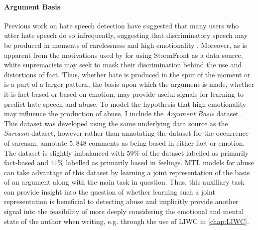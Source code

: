 \paragraph{Argument Basis}
Previous work on hate speech detection have suggested that many users who utter hate speech do so infrequently, suggesting that discriminatory speech may be produced in moments of carelessness and high emotionality \citep{Waseem:2016}.
Moreover, as is apparent from the motivations used by \citet{Garcia:2019} for using StormFront as a data source, white supremacists may seek to mask their discrimination behind the use and distortions of fact.
Thus, whether hate is produced in the spur of the moment or is a part of a larger pattern, the basis upon which the argument is made, whether it is fact-based or based on emotion, may provide useful signals for learning to predict hate speech and abuse.
To model the hypothesis that high emotionality may influence the production of abuse, I include the \textit{Argument Basis} dataset \citep{Oraby_factfeel:2015}.
This dataset was developed using the same underlying data source as the \textit{Sarcasm} dataset, however rather than annotating the dataset for the occurrence of sarcasm, \citet{Oraby_factfeel:2015} annotate $5,848$ comments as being based in either fact or emotion.
The dataset is slightly imbalanced with $59\%$ of the dataset labelled as primarily fact-based and $41\%$ labelled as primarily based in feelings.
MTL models for abuse can take advantage of this dataset by learning a joint representation of the basis of an argument along with the main task in question.
Thus, this auxiliary task can provide insight into the question of whether learning such a joint representation is beneficial to detecting abuse and implicitly provide another signal into the feasibility of more deeply considering the emotional and mental state of the author when writing, e.g. through the use of LIWC in \cref{chap:LIWC}.

